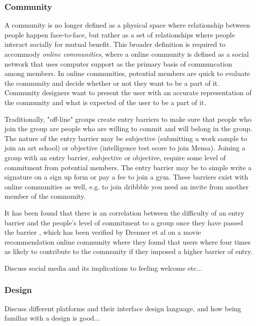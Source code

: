 \subsubsection{Community}

A community is no longer defined as a physical space where relationship between people happen face-to-face, but rather as a set of relationships where people interact socially for mutual benefit. This broader definition is required to accommody \textit{online communities}, where a online community is defined as a social network that uses computer support as the primary basis of communcation among members.  In online communities, potential members are quick to evaluate the community and decide whether or not they want to be a part of it. Community designers want to present the user with an accurate representation of the community and what is expected of the user to be a part of it.

Traditionally, "off-line" groups create entry barriers to make sure that people who join the group are people who are willing to commit and will belong in the group. The nature of the entry barrier may be subjective (submitting a work sample to join an art school) or objective (intelligence test score to join Mensa). Joining a group with an entry barrier, subjective or objective, require some level of commitment from potential members. The entry barrier may be to simple write a signature on a sign up form or pay a fee to join a gym. These barriers exist with online communities as well, e.g. to join dribbble you need an invite from another member of the community.

It has been found that there is an correlation between the difficulty of an entry barrier and the people's level of commitment to a group once they have passed the barrier \cite{Aronson1959}, which has been verified by Drenner et al \cite{Drenner2008} on a movie recommendation online community where they found that users where four times as likely to contribute to the community if they imposed a higher barrier of entry.

Discuss social media and its implications to feeling welcome etc...
\subsubsection{Design}
Discuss different platforms and their interface design language, and how being familiar with a design is good...


